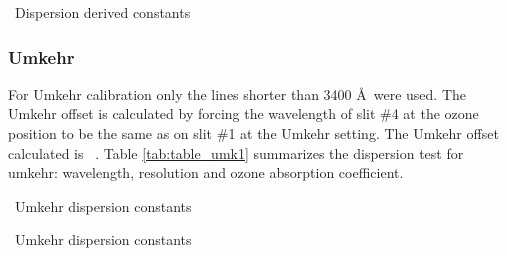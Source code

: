 \begin{table}[htbp!] \centering
		\caption{\calyear\ Dispersion derived constants}
		\label{tab:table_QDETAIL1}
		
\end{table}

\clearpage
\subsubsection{Umkehr}
For Umkehr calibration only the lines shorter than 3400 \AA\ were used.
The Umkehr offset is calculated by forcing the wavelength of slit \#4 at the ozone position to be the same as on slit \#1 at the Umkehr setting. The Umkehr offset calculated is \textbf{\UMKoffsetnew}\ . 
Table \ref{tab:table_umk1} summarizes the dispersion test for umkehr: wavelength, resolution and ozone absorption coefficient.
\vspace{1cm}
\begin{table}[htbp!] \centering
		\caption{\calyearold\ Umkehr dispersion constants}
		\label{tab:table_umk}
		
\end{table}

\begin{table}[htbp!] \centering
		\caption{\calyear\ Umkehr dispersion constants}
		\label{tab:table_umk1}
		
\end{table}




